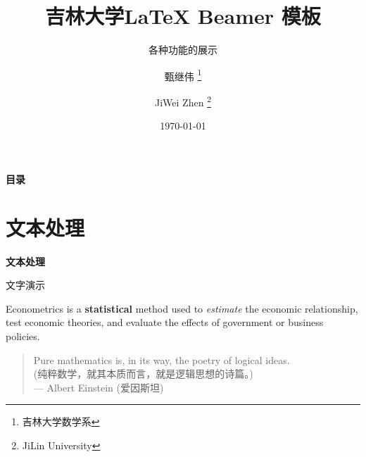 \documentclass[12pt, aspectratio=169]{beamer}
\begin{document}
\title[\LaTeX{}  Beamer 如何做?]{\Huge{\textbf{吉林大学\LaTeX{} Beamer 模板}}} 
\subtitle{各种功能的展示} 

\author[甄继伟]{%
甄继伟  \thanks{\small 吉林大学数学系} \and%
JiWei Zhen \thanks{\small JiLin University}
}


\date[\today]{\today}


\begin{frame}
	\titlepage 
\end{frame}


\begin{frame}{\textbf{目录}}
	\tableofcontents 
\end{frame}


\section{文本处理}


\linespread{1}  
\begin{frame}{\textbf{文本处理}}
\linespread{1.5} 

	文字演示
	
	\bigskip 
	 
	\pause 
	
	 \alert{Econometrics} is a \textbf{statistical} method used to \textit{estimate} the economic relationship,
	 test economic theories, and evaluate the effects of government or business policies.
	 
	 \pause
	
	\bigskip 

	\begin{quote}
		Pure mathematics is, in its way, the poetry of logical ideas.\\
		(纯粹数学，就其本质而言，就是逻辑思想的诗篇。)\\
		--- Albert Einstein (爱因斯坦)
	\end{quote}
	
\end{frame}
\end{document}
